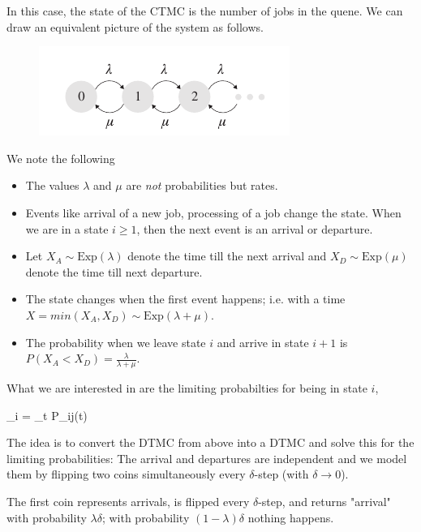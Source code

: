 In this case, the state of the CTMC is the number of jobs in the quene. We can draw an equivalent picture of the system as follows.


\begin{figure}[hbt!]
\centering
\includegraphics[scale=0.75]{images/queuing_02_02.png}
\end{figure}


We note the following

\begin{itemize}

\item The values $\lambda$ and $\mu$ are \emph{not} probabilities but rates.

\item Events like arrival of a new job, processing of a job change the state. When we are in a state $i \geq 1$, then the next event is an arrival or departure.

\item Let $X_A \sim \text{Exp}(\lambda)$ denote the time till the next arrival and $X_D \sim \text{Exp}(\mu)$ denote the time till next departure.

\item The state changes when the first event happens; i.e. with a time $X = min(X_A, X_D) \sim \text{Exp}(\lambda + \mu)$.

\item The probability when we leave state $i$ and arrive in state $i+1$ is $P(X_A < X_D) = \frac{\lambda}{\lambda + \mu}$.

\end{itemize}


What we are interested in are the limiting probabilties for being in state $i$,

\bee
\pi_i = \lim_{t \rightarrow \infty} P_{ij}(t)
\eee

The idea is to convert the DTMC from above into a DTMC and solve this for the limiting probabilities: The arrival and departures are independent and we model them by flipping two coins simultaneously every $\delta$-step (with $\delta \rightarrow 0$).

The first coin represents arrivals, is flipped every $\delta$-step, and returns "arrival" with probability $\lambda \delta$; with probability $(1-\lambda)\delta$ nothing happens.

